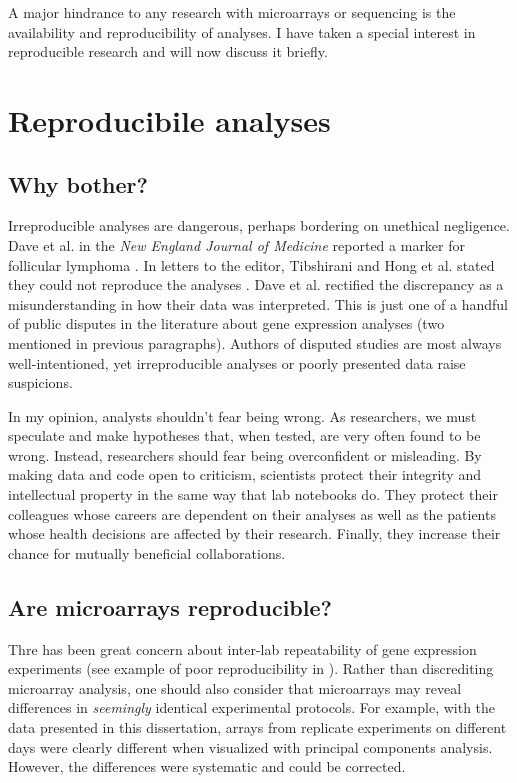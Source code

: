 A major hindrance to any 
research with microarrays or sequencing is the availability
and reproducibility of analyses. I have taken
a special interest in reproducible research and will now discuss it briefly.

\section{Reproducibile analyses}

\subsection{Why bother?}

Irreproducible analyses are dangerous, perhaps bordering on unethical negligence. 
Dave et al. in the \textit{New England
Journal of Medicine} reported a marker for follicular lymphoma \cite{Dave:2004vl}. 
In letters to the editor, Tibshirani and Hong et al. stated they 
could not reproduce the analyses \cite{Tibshirani:2005el}. 
Dave et al. rectified the discrepancy as a misunderstanding
in how their data was interpreted. This is just one of a handful of
public disputes in the literature about gene expression analyses (two mentioned
in previous paragraphs).
Authors of disputed studies are most always well-intentioned, yet 
irreproducible analyses or poorly presented data raise suspicions.

In my opinion, analysts shouldn't fear being wrong.
As researchers, we must speculate and make
hypotheses that, when tested, are very often found to be wrong.
Instead, researchers should fear being overconfident or misleading. 
By making data and code open to criticism,
scientists protect their integrity and intellectual property in the same
way that lab notebooks do. They protect their colleagues
whose careers are dependent on their analyses as well as the patients
whose health decisions are affected by their research.
Finally, they increase their chance for mutually beneficial collaborations.

\subsection{Are microarrays reproducible?}

Thre has been great concern about inter-lab repeatability of 
gene expression experiments
(see example of poor reproducibility in 
\cite{Evsikov:2003ic,Fortunel:2003eu,Ivanova:2003bh,RamalhoSantos:2002dy}). 
Rather than discrediting microarray analysis,
one should also consider that microarrays
may reveal differences in \textit{seemingly} identical experimental protocols.
For example, with the data presented in this dissertation, arrays from
replicate experiments on different days were clearly different when
visualized with principal components analysis. However, the differences
were systematic and could be corrected.

